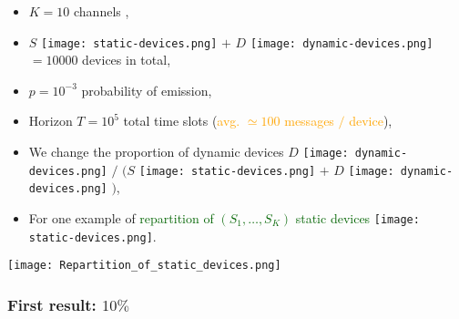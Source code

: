 \begin{frameO}

    \vspace*{5pt}

        \begin{itemize}
            \item
                \(K = 10\) channels \slotmachine,
            \item
                \(S\) \texttt{[image: static-devices.png]}
                \(+\)
                \(D\) \texttt{[image: dynamic-devices.png]}
                \(= 10000\) devices
                in total,
            \pause
            \item
                \(p = 10^{-3}\) probability of emission,
            \item
                Horizon \(T = 10^5\) total time slots
                (\textcolor{orange}{avg. \(\simeq 100\) messages \(/\) device}),
            \pause
            \item
                We change the proportion of dynamic devices
                \(D\)
                \texttt{[image: dynamic-devices.png]}
                \(/\)
                \((S\)
                \texttt{[image: static-devices.png]}
                \(+\)
                \(D\)
                \texttt{[image: dynamic-devices.png]}
                \()\),
            \item
                For one example of \textcolor{darkgreen}{repartition of \((S_1,\dots,S_{K})\) static devices} \texttt{[image: static-devices.png]}.
        \end{itemize}
        \vspace*{-10pt}
        \begin{center}
            \texttt{[image: Repartition\_of\_static\_devices.png]}
        \end{center}


\end{frameO}



\subsubsection{First result: $10\%$}

